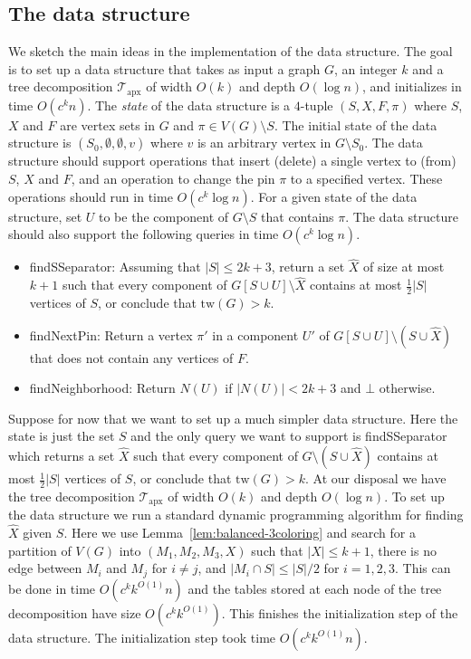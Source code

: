 \documentclass[a4paper,11pt]{article}
\theoremstyle{definition}
\theoremstyle{remark}
\newcommand{\qnei}{\textnormal{findNeighborhood}}
\newcommand{\qSsep}{\textnormal{findSSeparator}}
\newcommand{\qpin}{\textnormal{findNextPin}}
\newcommand{\pin}{\pi}
\newcommand{\td}{\mathcal{T}} \newcommand{\tw}{\mathrm{tw}} \newcommand{\w}{\mathrm{w}}
\newcommand{\apx}{\textrm{apx}}
\begin{document}
\subsection{The data structure}
\label{sec:dsoutline}
We sketch the main ideas in the implementation of the data structure.
The goal is to set up a data structure that takes as input a graph
$G$, an integer $k$ and a tree decomposition $\td_\apx$ of width
$O(k)$ and depth $O(\log n)$, and initializes in time $O(c^kn)$.  The
{\em state} of the data structure is a $4$-tuple $(S,X,F,\pin)$ where
$S$, $X$ and $F$ are vertex sets in $G$ and $\pin \in V(G) \setminus
S$.  The initial state of the data structure is
$(S_0,\emptyset,\emptyset,v)$ where $v$ is an arbitrary vertex in
$G\setminus S_0$.  The data structure should support operations that
insert (delete) a single vertex to (from) $S$, $X$ and $F$, and an
operation to change the pin $\pin$ to a specified vertex.  These
operations should run in time $O(c^k\log n)$.  For a given state of
the data structure, set $U$ to be the component of $G \setminus S$
that contains $\pin$.  The data structure should also support the
following queries in time $O(c^k\log n)$.
\begin{itemize}\setlength\itemsep{-.7mm}
\item \qSsep{}: Assuming that $|S| \leq 2k+3$, return a set $\hat{X}$ of
  size at most $k+1$ such that every component of $G[S \cup U]
  \setminus \hat{X}$ contains at most $\frac{1}{2}|S|$ vertices of
  $S$, or conclude that $\tw(G) > k$.
\item \qpin{}: Return a vertex $\pin{}'$ in a component $U'$ of $G[S \cup
  U] \setminus (S \cup \hat{X})$ that does not contain any vertices of $F$.
\item \qnei{}: Return $N(U)$ if $|N(U)| < 2k+3$ and $\bot$ otherwise.
\end{itemize}

Suppose for now that we want to set up a much simpler data structure.
Here the state is just the set $S$ and the only query we want to
support is \qSsep{} which returns a set $\hat{X}$ such that every
component of $G \setminus (S \cup \hat{X})$ contains at most
$\frac{1}{2}|S|$ vertices of $S$, or conclude that $\tw(G) > k$.  At
our disposal we have the tree decomposition $\td_\apx$ of width $O(k)$
and depth $O(\log n)$.  To set up the data structure we run a standard
dynamic programming algorithm for finding $\hat{X}$ given $S$.  Here
we use Lemma~\ref{lem:balanced-3coloring} and search for a partition
of $V(G)$ into $(M_1,M_2,M_3,X)$ such that $|X| \leq k+1$, there is no
edge between $M_i$ and $M_j$ for $i\neq j$, and $|M_i\cap S|\leq
|S|/2$ for $i=1,2,3$.  This can be done in time $O(c^kk^{O(1)}n)$ and
the tables stored at each node of the tree decomposition have size
$O(c^kk^{O(1)})$.  This finishes the initialization step of the data
structure.  The initialization step took time $O(c^kk^{O(1)}n)$.
\end{document}

